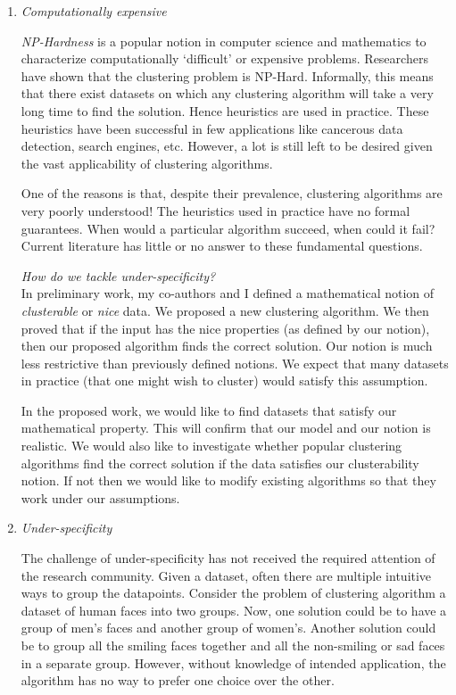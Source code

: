 \documentclass[12pt]{article}
\begin{document}
\begin{enumerate}[noitemsep,leftmargin=*]
\item \emph{Computationally expensive}

\emph{NP-Hardness} is a popular notion in computer science and mathematics to characterize computationally `difficult' or expensive problems. Researchers have shown that the clustering problem is NP-Hard. Informally, this means that there exist datasets on which any clustering algorithm will take a very long time to find the solution. Hence heuristics are used in practice. These heuristics have been successful in few applications like cancerous data detection, search engines, etc. However, a lot is still left to be desired given the vast applicability of clustering algorithms. 

One of the reasons is that, despite their prevalence, clustering algorithms are very poorly understood! The heuristics used in practice have no formal guarantees. When would a particular algorithm succeed, when could it fail? Current literature has little or no answer to these fundamental questions. 

\emph{How do we tackle under-specificity?}\\ 
In preliminary work, my co-authors and I defined a mathematical notion of {\em clusterable} or {\em nice} data. We proposed a new clustering algorithm. We then proved that if the input has the nice properties (as defined by our notion), then our proposed algorithm finds the correct solution. Our notion is much less restrictive than previously defined notions. We expect that many datasets in practice (that one might wish to cluster) would satisfy this assumption.

In the proposed work, we would like to find datasets that satisfy our mathematical property. This will confirm that our model and our notion is realistic. We would also like to investigate whether popular clustering algorithms find the correct solution if the data satisfies our clusterability notion. If not then we would like to modify existing algorithms so that they work under our assumptions. 

\item \textit{Under-specificity}

The challenge of under-specificity has not received the required attention of the research community. Given a dataset, often there are multiple intuitive ways to group the datapoints. Consider the problem of clustering algorithm a dataset of human faces into two groups. Now, one solution could be to have a group of men's faces and another group of women's. Another solution could be to group all the smiling faces together and all the non-smiling or sad faces in a separate group. However, without knowledge of intended application, the algorithm has no way to prefer one choice over the other. %


\end{enumerate}
\end{document}
